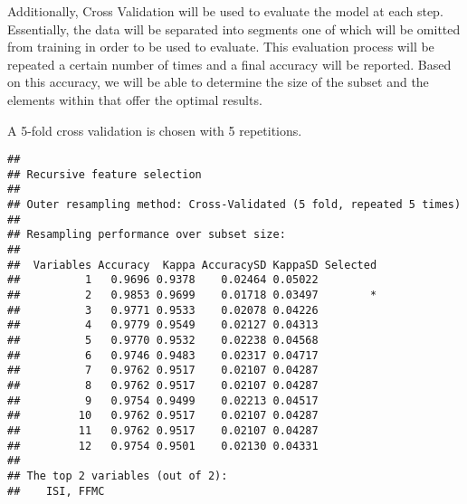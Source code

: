 \documentclass[
]{article}
\newenvironment{Shaded}{\begin{snugshade}}{\end{snugshade}}
\newcommand{\AttributeTok}[1]{\textcolor[rgb]{0.13,0.29,0.53}{#1}}
\newcommand{\CommentTok}[1]{\textcolor[rgb]{0.56,0.35,0.01}{\textit{#1}}}
\newcommand{\DecValTok}[1]{\textcolor[rgb]{0.00,0.00,0.81}{#1}}
\newcommand{\FunctionTok}[1]{\textcolor[rgb]{0.13,0.29,0.53}{\textbf{#1}}}
\newcommand{\NormalTok}[1]{#1}
\newcommand{\OtherTok}[1]{\textcolor[rgb]{0.56,0.35,0.01}{#1}}
\newcommand{\SpecialCharTok}[1]{\textcolor[rgb]{0.81,0.36,0.00}{\textbf{#1}}}
\newcommand{\StringTok}[1]{\textcolor[rgb]{0.31,0.60,0.02}{#1}}
\begin{document}
Additionally, Cross Validation will be used to evaluate the model at
each step. Essentially, the data will be separated into segments one of
which will be omitted from training in order to be used to evaluate.
This evaluation process will be repeated a certain number of times and a
final accuracy will be reported. Based on this accuracy, we will be able
to determine the size of the subset and the elements within that offer
the optimal results.

A 5-fold cross validation is chosen with 5 repetitions.

\begin{Shaded}
\end{Shaded}

\begin{verbatim}
## 
## Recursive feature selection
## 
## Outer resampling method: Cross-Validated (5 fold, repeated 5 times) 
## 
## Resampling performance over subset size:
## 
##  Variables Accuracy  Kappa AccuracySD KappaSD Selected
##          1   0.9696 0.9378    0.02464 0.05022         
##          2   0.9853 0.9699    0.01718 0.03497        *
##          3   0.9771 0.9533    0.02078 0.04226         
##          4   0.9779 0.9549    0.02127 0.04313         
##          5   0.9770 0.9532    0.02238 0.04568         
##          6   0.9746 0.9483    0.02317 0.04717         
##          7   0.9762 0.9517    0.02107 0.04287         
##          8   0.9762 0.9517    0.02107 0.04287         
##          9   0.9754 0.9499    0.02213 0.04517         
##         10   0.9762 0.9517    0.02107 0.04287         
##         11   0.9762 0.9517    0.02107 0.04287         
##         12   0.9754 0.9501    0.02130 0.04331         
## 
## The top 2 variables (out of 2):
##    ISI, FFMC
\end{verbatim}
\end{document}
